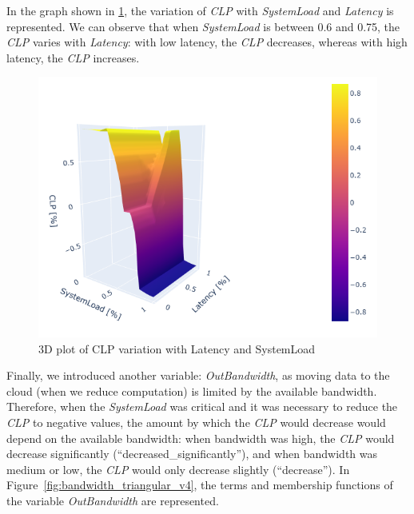 \documentclass[titlepage]{article}
\begin{document}
In the graph shown in \cref{fig:3d_latency_triangular_v4}, the variation of \textit{CLP} with \textit{SystemLoad} and \textit{Latency} is represented.
We can observe that when \textit{SystemLoad} is between 0.6 and 0.75, the \textit{CLP} varies with \textit{Latency}: with low latency, the \textit{CLP} decreases, whereas with high latency, the \textit{CLP} increases.

\begin{figure}[H]
    \centering
\includegraphics[scale = 0.6]{../images/3d_triangular_v4_latency}
\caption{3D plot of CLP variation with Latency and SystemLoad}
\label{fig:3d_latency_triangular_v4}
\end{figure}



Finally, we introduced another variable: \textit{OutBandwidth}, as moving data to the cloud (when we reduce computation) is limited by the available bandwidth.
Therefore, when the \textit{SystemLoad} was critical and it was necessary to reduce the \textit{CLP} to negative values, the amount by which the \textit{CLP} would decrease would depend on the available bandwidth: when bandwidth was high, the \textit{CLP} would decrease significantly (``decreased\_significantly''), and when bandwidth was medium or low, the \textit{CLP} would only decrease slightly (``decrease'').
In Figure~\cref{fig:bandwidth_triangular_v4}, the terms and membership functions of the variable \textit{OutBandwidth} are represented.
\end{document}
